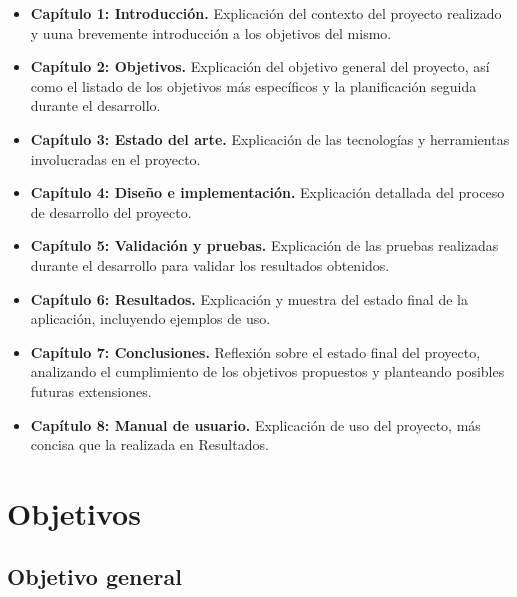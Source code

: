 \documentclass[a4paper, 12pt]{book}
\begin{document}
\begin{itemize}
    \item \textbf{Capítulo 1: Introducción.} Explicación del contexto del proyecto realizado y uuna brevemente introducción a los objetivos del mismo.
    \item \textbf{Capítulo 2: Objetivos.} Explicación del objetivo general del proyecto, así como el listado de los objetivos más específicos y la planificación seguida durante el desarrollo.
    \item \textbf{Capítulo 3: Estado del arte.} Explicación de las tecnologías y herramientas involucradas en el proyecto.
    \item \textbf{Capítulo 4: Diseño e implementación.} Explicación detallada del proceso de desarrollo del proyecto.
    \item \textbf{Capítulo 5: Validación y pruebas.} Explicación de las pruebas realizadas durante el desarrollo para validar los resultados obtenidos.
    \item \textbf{Capítulo 6: Resultados.} Explicación y muestra del estado final de la aplicación, incluyendo ejemplos de uso.
    \item \textbf{Capítulo 7: Conclusiones.} Reflexión sobre el estado final del proyecto, analizando el cumplimiento de los objetivos propuestos y planteando posibles futuras extensiones.
    \item \textbf{Capítulo 8: Manual de usuario.} Explicación de uso del proyecto, más concisa que la realizada en Resultados.
    
\end{itemize}


\cleardoublepage %
\chapter{Objetivos} %
\label{chap:objetivos} %

\section{Objetivo general} %
\label{sec:objetivo-general} %
\end{document}
